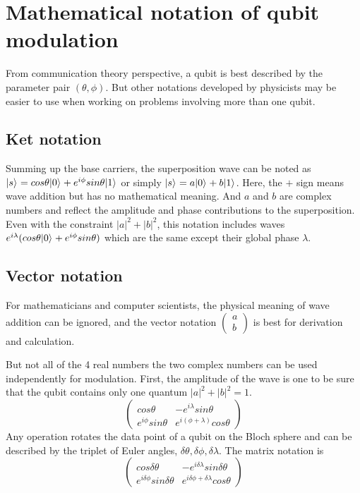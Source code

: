 \documentclass[Letter,11pt]{book}
\begin{document}
\section{Mathematical notation of qubit modulation}
From communication theory perspective, a qubit is best described by the parameter pair $(\theta, \phi)$. But other notations developed by physicists may be easier to use when working on problems involving more than one qubit. 
\subsection{Ket notation}
Summing up the base carriers, the superposition wave can be noted as $\vert {s} \rangle_{} = cos{\theta} \vert {0} \rangle_{} + e^{i \phi} sin{\theta} \vert {1} \rangle_{}$ or simply $\vert {s} \rangle_{} = a \vert {0} \rangle_{} + b \vert {1} \rangle_{}$. Here, the $+$ sign means wave addition but has no mathematical meaning. And $a$ and $b$ are complex numbers and reflect the amplitude and phase contributions to the superposition. Even with the constraint $|a|^2+ |b|^2$, this notation includes waves $e^{i\lambda} (cos{\theta} \vert {0} \rangle_{} + e^{i \phi} sin{\theta})$ which are the same except their global phase $\lambda$.

\subsection{Vector notation}
For mathematicians and computer scientists, the physical meaning of wave addition can be ignored, and the vector notation $
\begin{pmatrix}
    a \\
    b
\end{pmatrix}$ is best for derivation and calculation.

But not all of the 4 real numbers the two complex numbers can be used independently for modulation. First, the amplitude of the wave is one to be sure that the qubit contains only one quantum $|a|^2 + |b|^2 = 1$.
\begin{equation}
    \begin{pmatrix}
    cos\theta & -e^{i\lambda} sin\theta \\
    e^{i\phi} sin\theta & e^{i(\phi + \lambda)} cos\theta
\end{pmatrix}
\end{equation}
Any operation rotates the data point of a qubit on the Bloch sphere and can be described by the triplet of Euler angles, $\delta \theta, \delta \phi, \delta \lambda$. The matrix notation is
\begin{equation}
    \begin{pmatrix}
        cos\delta \theta & -e^{i\delta \lambda} sin\delta \theta \\
        e^{i \delta \phi} sin\delta \theta & e^{i \delta \phi+ \delta \lambda} cos\theta 
    \end{pmatrix}
\end{equation}
\end{document}
